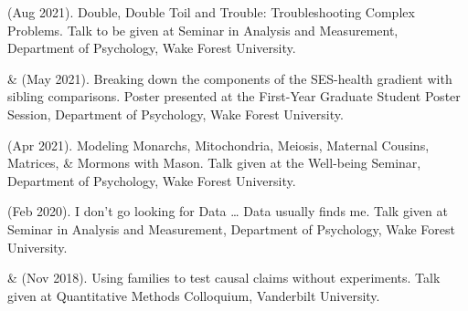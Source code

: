 
\item\meb (Aug 2021). Double, Double Toil and Trouble: Troubleshooting Complex Problems. Talk to be given at Seminar in Analysis and Measurement, Department of Psychology, Wake Forest University. 
%
\item \yrh \& \meb (May 2021). Breaking down the components of the SES-health gradient with sibling comparisons. Poster presented at the First-Year Graduate Student Poster Session, Department of Psychology, Wake Forest University. 

\item\meb (Apr 2021). Modeling Monarchs, Mitochondria, Meiosis, Maternal Cousins, Matrices, \& Mormons with Mason. Talk given at the Well-being Seminar, Department of Psychology, Wake Forest University. 

\item\meb (Feb 2020). I don't go looking for Data … Data usually finds me. Talk given at Seminar in Analysis and Measurement, Department of Psychology, Wake Forest University. 
%
\item\meb \& \Joe (Nov 2018). Using families to test causal claims without experiments. Talk given at Quantitative Methods Colloquium, Vanderbilt University. 


